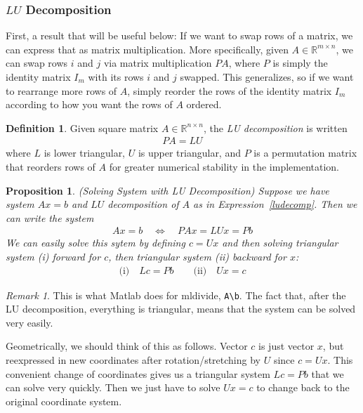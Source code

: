 \documentclass[12pt]{article}
\numberwithin{equation}{section} %
\theoremstyle{plain}
\newtheorem{prop}[thm]{Proposition}
\theoremstyle{definition}
\newtheorem{defn}[thm]{Definition}
\theoremstyle{remark}
\newtheorem*{rmk}{Remark}
\newcommand{\R}{\mathbb{R}}
\begin{document}
\subsubsection{$LU$ Decomposition}

First, a result that will be useful below: If we want to swap rows of a
matrix, we can express that as matrix multiplication. More specifically,
given $A\in\R^{m\times n}$, we can swap rows $i$ and $j$ via
matrix multiplication $PA$, where $P$ is simply the identity matrix
$I_m$ with its rows $i$ and $j$ swapped. This generalizes, so if
we want to rearrange more rows of $A$, simply reorder the rows of the
identity matrix $I_m$ according to how you want the rows of $A$ ordered.

\begin{defn}
Given square matrix $A\in\R^{n\times n}$, the \emph{LU decomposition}
is written
\begin{align}
  PA = LU
  \label{ludecomp}
\end{align}
where $L$ is lower triangular, $U$ is upper triangular, and $P$ is a
permutation matrix that reorders rows of $A$ for greater numerical
stability in the implementation.
\end{defn}

\begin{prop}\emph{(Solving System with LU Decomposition)}
Suppose we have system $Ax=b$ and $LU$ decomposition of $A$ as in
Expression~\ref{ludecomp}. Then we can write the system
\begin{align*}
  Ax = b
  \quad\iff\quad
  PAx = LUx = Pb
\end{align*}
We can easily solve this sytem by defining $c=Ux$ and then solving
triangular system (i) forward for $c$, then triangular system (ii)
backward for $x$:
\begin{align*}
  \text{(i)}\quad Lc = Pb
  \qquad
  \text{(ii)}\quad Ux = c
\end{align*}
\end{prop}
\begin{rmk}
This is what Matlab does for mldivide, \texttt{A\textbackslash b}.
The fact that, after the LU decomposition, everything is triangular,
means that the system can be solved very easily.

Geometrically, we should think of this as follows. Vector $c$ is just
vector $x$, but reexpressed in new coordinates after rotation/stretching
by $U$ since $c=Ux$. This convenient change of coordinates gives us a
triangular system $Lc = Pb$ that we can solve very quickly. Then we just
have to solve $Ux = c$ to change back to the original coordinate system.
\end{rmk}
\end{document}
